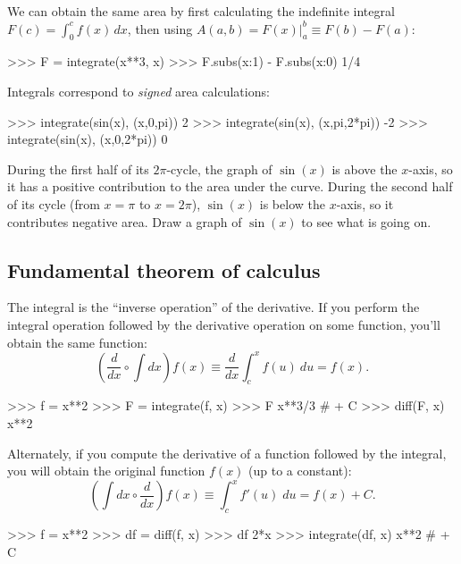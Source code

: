 \noindent
We can obtain the same area by first calculating the indefinite integral $F(c)=\int_0^c \!f(x)\,dx$,
then using $A(a,b) = F(x)\big\vert_a^b \equiv F(b) - F(a)$:



\small
\begin{verbatimtab}
>>> F = integrate(x**3, x)
>>> F.subs({x:1}) - F.subs({x:0})   
1/4
\end{verbatimtab}
\normalsize
Integrals correspond to \emph{signed} area calculations:



\small
\begin{verbatimtab}
>>> integrate(sin(x), (x,0,pi))
2
>>> integrate(sin(x), (x,pi,2*pi))
-2
>>> integrate(sin(x), (x,0,2*pi))
0
\end{verbatimtab}
\normalsize

\noindent
During the first half of its $2\pi$-cycle,
the graph of $\sin(x)$ is above the $x$-axis, so it has a positive contribution to the area under the curve.
During the second half of its cycle (from $x=\pi$ to $x=2\pi$),
$\sin(x)$ is below the $x$-axis, so it contributes negative area.
Draw a graph of $\sin(x)$ to see what is going on. 

\subsection{Fundamental theorem of calculus}
\label{calculus:fundamental_theorem_of_calculus}
The integral is the ``inverse operation'' of the derivative.
If you perform the integral operation followed by the derivative operation on some function,
you'll obtain the same function:
\[
  \left(\frac{d}{dx} \circ \int dx \right) f(x) \equiv \frac{d}{dx} \int_c^x f(u)\:du = f(x).
\]



\small
\begin{verbatimtab}
>>> f = x**2
>>> F = integrate(f, x)
>>> F
x**3/3           # + C
>>> diff(F, x)
x**2
\end{verbatimtab}
\normalsize

\noindent
Alternately, if you compute the derivative of a function followed by the integral,
you will obtain the original function $f(x)$ (up to a constant):
\[
  \left( \int dx \circ \frac{d}{dx}\right) f(x) \equiv \int_c^x f'(u)\;du = f(x) + C.
\]



\small
\begin{verbatimtab}
>>> f = x**2
>>> df = diff(f, x)
>>> df
2*x
>>> integrate(df, x)
x**2    # + C
\end{verbatimtab}
\normalsize

